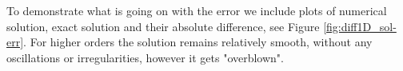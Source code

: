 To demonstrate what is going on with the error we include plots of numerical solution, exact solution and their 
absolute difference, see Figure \ref{fig:diff1D_sol-err}. For higher orders the solution remains relatively smooth, 
without any oscillations or irregularities, however it gets "overblown".
